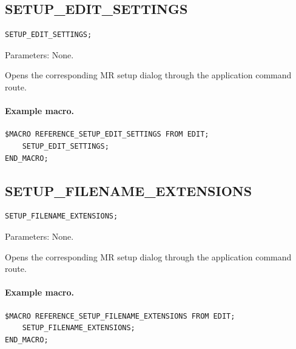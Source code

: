 \documentclass[a4paper,10pt,twoside,openany]{book}
\newenvironment{mrmacextension}{\begin{changebar}}{\end{changebar}}
\begin{document}
\begin{mrmacextension}
\label{prim:procedure-setup-edit-settings}
\subsection*{SETUP\_EDIT\_SETTINGS}
\begin{verbatim}
SETUP_EDIT_SETTINGS;
\end{verbatim}
Parameters: None.

Opens the corresponding MR setup dialog through the application command route.

\paragraph{Example macro.}
\begin{verbatim}
$MACRO REFERENCE_SETUP_EDIT_SETTINGS FROM EDIT;
    SETUP_EDIT_SETTINGS;
END_MACRO;
\end{verbatim}
\end{mrmacextension}

\begin{mrmacextension}
\label{prim:procedure-setup-filename-extensions}
\subsection*{SETUP\_FILENAME\_EXTENSIONS}
\begin{verbatim}
SETUP_FILENAME_EXTENSIONS;
\end{verbatim}
Parameters: None.

Opens the corresponding MR setup dialog through the application command route.

\paragraph{Example macro.}
\begin{verbatim}
$MACRO REFERENCE_SETUP_FILENAME_EXTENSIONS FROM EDIT;
    SETUP_FILENAME_EXTENSIONS;
END_MACRO;
\end{verbatim}
\end{mrmacextension}
\end{document}
